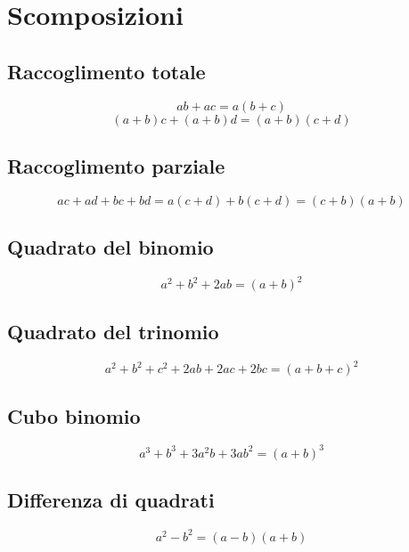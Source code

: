 \chapter{Scomposizioni}
\section{Raccoglimento totale}
\begin{equation}
ab+ac=a(b+c)
\end{equation}
\begin{equation}
(a+b)c+(a+b)d=(a+b)(c+d)
\end{equation}
\section{Raccoglimento parziale}
\begin{equation}
ac+ad+bc+bd=a(c+d)+b(c+d)=(c+b)(a+b)
\end{equation}
\section{Quadrato del binomio}
\begin{equation}
	a^2+b^2+2ab=(a+b)^2
\end{equation}
\section{Quadrato del trinomio}
\begin{equation}
a^2+b^2+c^2+2ab+2ac+2bc=(a+b+c)^2
\end{equation}
\section{Cubo binomio}
\begin{equation}
a^3+b^3+3a^2b+3ab^2=(a+b)^3
\end{equation}
\section{Differenza di quadrati}
\begin{equation}
a^2-b^2=(a-b)(a+b)
\end{equation}
